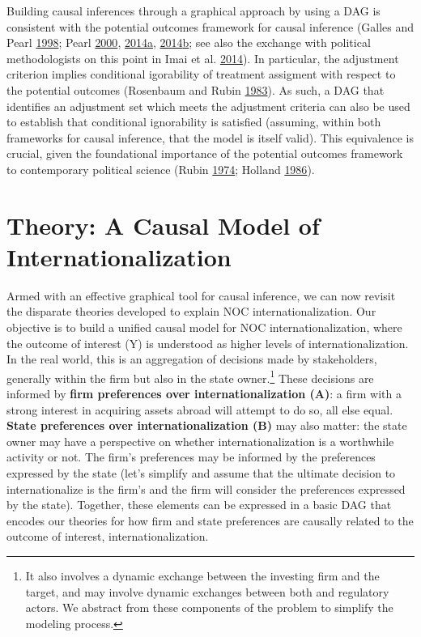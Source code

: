 \documentclass[11pt,]{book}
\begin{document}
Building causal inferences through a graphical approach by using a DAG is consistent with the potential outcomes framework for causal inference (Galles and Pearl \protect\hyperlink{ref-galles_axiomatic_1998}{1998}; Pearl \protect\hyperlink{ref-pearl_causality_2000}{2000}, \protect\hyperlink{ref-pearl_interpretation_2014}{2014}\protect\hyperlink{ref-pearl_interpretation_2014}{a}, \protect\hyperlink{ref-pearl_reply_2014}{2014}\protect\hyperlink{ref-pearl_reply_2014}{b}; see also the exchange with political methodologists on this point in Imai et al. \protect\hyperlink{ref-imai_comment_2014-1}{2014}). In particular, the adjustment criterion implies conditional igorability of treatment assigment with respect to the potential outcomes (Rosenbaum and Rubin \protect\hyperlink{ref-rosenbaum_central_1983}{1983}). As such, a DAG that identifies an adjustment set which meets the adjustment criteria can also be used to establish that conditional ignorability is satisfied (assuming, within both frameworks for causal inference, that the model is itself valid). This equivalence is crucial, given the foundational importance of the potential outcomes framework to contemporary political science (Rubin \protect\hyperlink{ref-rubin_estimating_1974}{1974}; Holland \protect\hyperlink{ref-holland_statistics_1986}{1986}).

\hypertarget{theory02}{%
\section{Theory: A Causal Model of Internationalization}\label{theory02}}

Armed with an effective graphical tool for causal inference, we can now revisit the disparate theories developed to explain NOC internationalization. Our objective is to build a unified causal model for NOC internationalization, where the outcome of interest (Y) is understood as higher levels of internationalization. In the real world, this is an aggregation of decisions made by stakeholders, generally within the firm but also in the state owner.\footnote{It also involves a dynamic exchange between the investing firm and the target, and may involve dynamic exchanges between both and regulatory actors. We abstract from these components of the problem to simplify the modeling process.} These decisions are informed by \textbf{firm preferences over internationalization (A)}: a firm with a strong interest in acquiring assets abroad will attempt to do so, all else equal. \textbf{State preferences over internationalization (B)} may also matter: the state owner may have a perspective on whether internationalization is a worthwhile activity or not. The firm's preferences may be informed by the preferences expressed by the state (let's simplify and assume that the ultimate decision to internationalize is the firm's and the firm will consider the preferences expressed by the state). Together, these elements can be expressed in a basic DAG that encodes our theories for how firm and state preferences are causally related to the outcome of interest, internationalization.
\end{document}

